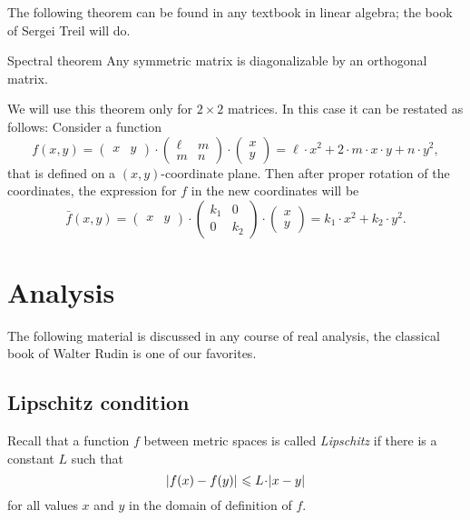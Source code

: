 The following theorem can be found in any textbook in linear algebra;
the book of Sergei Treil \cite{treil} will do.

\begin{thm}{Spectral theorem}\label{thm:spectral}
Any symmetric matrix is diagonalizable  by an orthogonal matrix.
\end{thm}

We will use this theorem only for $2{\times}2$ matrices.
In this case it can be restated as follows:
Consider a function 
\[f(x,y)=
\begin{pmatrix}
x&y
\end{pmatrix}
\cdot
\begin{pmatrix}
\ell&m
\\
m&n
\end{pmatrix}
\cdot
\begin{pmatrix}
x\\y
\end{pmatrix}
=\ell\cdot x^2+2\cdot m\cdot x\cdot y+n\cdot y^2,\]
that is defined on a $(x,y)$-coordinate plane.
Then after proper rotation of the coordinates, 
the expression for $f$ in the new coordinates will be
\[\bar f(x,y)=
\begin{pmatrix}
x&y
\end{pmatrix}
\cdot
\begin{pmatrix}
k_1&0
\\
0&k_2
\end{pmatrix}
\cdot
\begin{pmatrix}
x\\y
\end{pmatrix}
=k_1\cdot x^2+k_2\cdot y^2.\]

\section{Analysis}\label{sec:analysis}

The following material is discussed in any course of real analysis, the classical book of Walter Rudin \cite{rudin} is one of our favorites.


\subsection*{Lipschitz condition}

Recall that a function $f$ between metric spaces is called \emph{Lipschitz} if there is a constant $L$ such that 
\[\dist{f(x)}{f(y)}{}\le L\cdot\dist{x}{y}{}\]
for all values $x$ and $y$ in the domain of definition of $f$.

